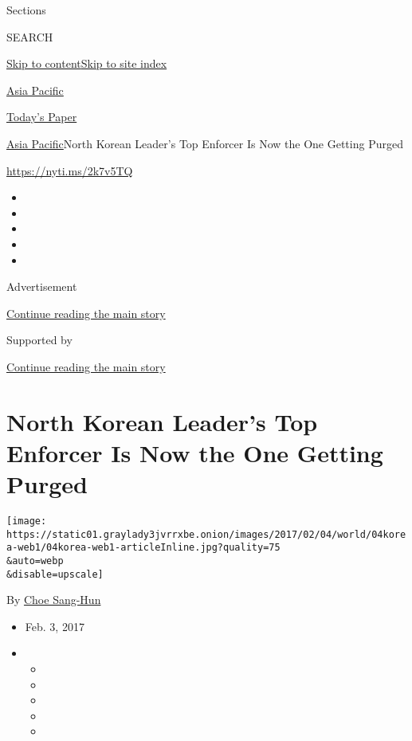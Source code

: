 Sections

SEARCH

\protect\hyperlink{site-content}{Skip to
content}\protect\hyperlink{site-index}{Skip to site index}

\href{https://www.nytimes3xbfgragh.onion/section/world/asia}{Asia
Pacific}

\href{https://myaccount.nytimes3xbfgragh.onion/auth/login?response_type=cookie\&client_id=vi}{}

\href{https://www.nytimes3xbfgragh.onion/section/todayspaper}{Today's
Paper}

\href{/section/world/asia}{Asia Pacific}\textbar{}North Korean Leader's
Top Enforcer Is Now the One Getting Purged

\url{https://nyti.ms/2k7v5TQ}

\begin{itemize}
\item
\item
\item
\item
\item
\end{itemize}

Advertisement

\protect\hyperlink{after-top}{Continue reading the main story}

Supported by

\protect\hyperlink{after-sponsor}{Continue reading the main story}

\hypertarget{north-korean-leaders-top-enforcer-is-now-the-one-getting-purged}{%
\section{North Korean Leader's Top Enforcer Is Now the One Getting
Purged}\label{north-korean-leaders-top-enforcer-is-now-the-one-getting-purged}}

\texttt{[image: https://static01.graylady3jvrrxbe.onion/images/2017/02/04/world/04korea-web1/04korea-web1-articleInline.jpg?quality=75\\\&auto=webp\\\&disable=upscale]}

By \href{http://www.nytimes3xbfgragh.onion/by/choe-sang-hun}{Choe
Sang-Hun}

\begin{itemize}
\item
  Feb. 3, 2017
\item
  \begin{itemize}
  \item
  \item
  \item
  \item
  \item
  \end{itemize}
\end{itemize}

